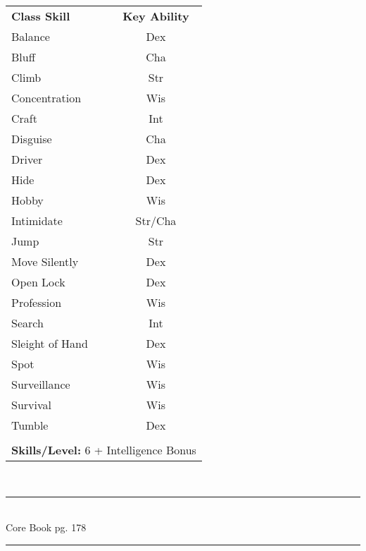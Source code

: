 \begin{table}[htb]
\raggedright
\begin{tabular}{l c}
\textbf{Class Skill} & \textbf{Key Ability}\\

Balance & Dex\\ 
Bluff & Cha\\ 
Climb & Str\\ 
Concentration & Wis\\ 
Craft & Int\\ 
Disguise & Cha\\ 
Driver & Dex\\ 
Hide & Dex\\ 
Hobby & Wis\\ 
Intimidate & Str/Cha\\ 
Jump & Str\\ 
Move Silently & Dex\\ 
Open Lock & Dex\\ 
Profession & Wis\\ 
Search & Int\\ 
Sleight of Hand & Dex\\ 
Spot & Wis\\ 
Surveillance & Wis\\ 
Survival & Wis\\ 
Tumble & Dex\\ 


\multicolumn{2}{l}{\cellcolor{white}}\\
\multicolumn{2}{l}{\cellcolor{white}\textbf{Skills/Level:} 6 + Intelligence Bonus}\\
\end{tabular}
\end{table}


\vspace*{-.5cm}


\begin{center}
\textsc{\Large}\\[0.25cm]
\rule{\linewidth}{0.5mm}\\[0.6cm]
\fontsize{30}{30} \selectfont Core Book pg. 178\\
\rule{\linewidth}{0.5mm}\\[0.6cm]
\vfill
\end{center}

\pagebreak



